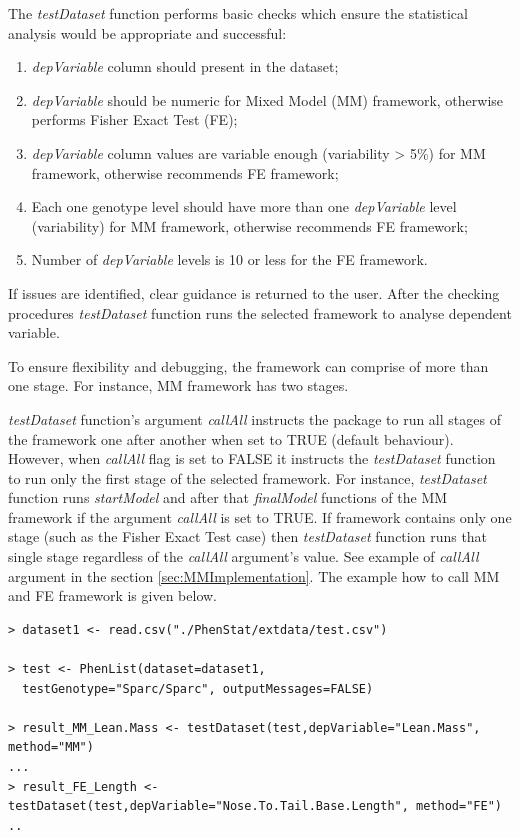 \documentclass[12pt,a4paper]{article}
\begin{document}
The \textit{testDataset} function performs basic checks which ensure the statistical analysis would be appropriate and successful:
\begin{enumerate}
\item \textit{depVariable} column should present in the dataset;
\item \textit{depVariable} should be numeric for Mixed Model (MM) framework, otherwise performs Fisher Exact Test (FE);
\item \textit{depVariable} column values are variable enough (variability > 5\%) for MM framework, otherwise recommends FE framework;
\item Each one genotype level should have more than one \textit{depVariable} level (variability) for MM framework, otherwise recommends FE framework;
\item Number of \textit{depVariable} levels is 10 or less for the FE framework.
\end{enumerate}

If issues are identified, clear guidance is returned to the user. 
After the checking procedures \textit{testDataset} function runs the selected framework to analyse dependent variable. 

To ensure flexibility and debugging, the framework can comprise of more than one stage. For instance, MM framework has two stages.

\textit{testDataset} function's argument \textit{callAll} instructs the package to run all stages of the framework one after another when set to TRUE (default behaviour). 
However, when \textit{callAll} flag is set to FALSE it instructs the \textit{testDataset} function to run only the first stage of the selected framework.
For instance, \textit{testDataset} function runs \textit{startModel} and after that \textit{finalModel} functions of the MM framework if the argument \textit{callAll} is set to TRUE. 
If framework contains only one stage (such as the Fisher Exact Test case) then \textit{testDataset} function runs that single stage regardless of the \textit{callAll} argument's value. 
See example of \textit{callAll} argument in the section \ref{sec:MMImplementation}.
The example how to call MM and FE framework is given below.
\begingroup
    \fontsize{8pt}{12pt}\selectfont
\begin{verbatim}
> dataset1 <- read.csv("./PhenStat/extdata/test.csv")

> test <- PhenList(dataset=dataset1,
  testGenotype="Sparc/Sparc", outputMessages=FALSE)

> result_MM_Lean.Mass <- testDataset(test,depVariable="Lean.Mass", method="MM")
...
> result_FE_Length <- testDataset(test,depVariable="Nose.To.Tail.Base.Length", method="FE")
..
\end{verbatim}
\endgroup
\end{document}
